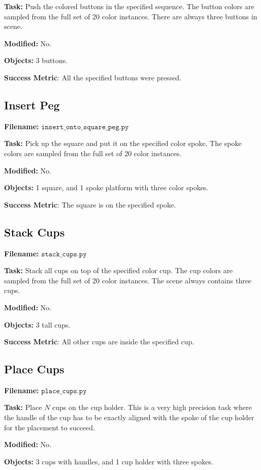 \documentclass{article}
\begin{document}
\textbf{Task:} Push the colored buttons in the specified sequence. The button colors are sampled from the full set of 20 color instances. There are always three buttons in scene. 

\textbf{Modified:} No.

\textbf{Objects:} 3 buttons.

\textbf{Success Metric}: All the specified buttons were pressed. 


\subsection{Insert Peg}
\textbf{Filename:} $\texttt{insert\_onto\_square\_peg.py}$ 

\textbf{Task:} Pick up the square and put it on the specified color spoke. The spoke colors are sampled from the full set of 20 color instances. 

\textbf{Modified:} No.

\textbf{Objects:} 1 square, and 1 spoke platform with three color spokes.

\textbf{Success Metric}: The square is on the specified spoke.

\subsection{Stack Cups}
\textbf{Filename:} $\texttt{stack\_cups.py}$ 

\textbf{Task:} Stack all cups on top of the specified color cup. The cup colors are sampled from the full set of 20 color instances. The scene always contains three cups.   

\textbf{Modified:} No.

\textbf{Objects:} 3 tall cups.

\textbf{Success Metric}: All other cups are inside the specified cup. 


\subsection{Place Cups}
\textbf{Filename:} $\texttt{place\_cups.py}$ 

\textbf{Task:} Place $N$ cups on the cup holder. This is a very high precision task where the handle of the cup has to be exactly aligned with the spoke of the cup holder for the placement to succeed. 

\textbf{Modified:} No.

\textbf{Objects:} 3 cups with handles, and 1 cup holder with three spokes.
\end{document}
